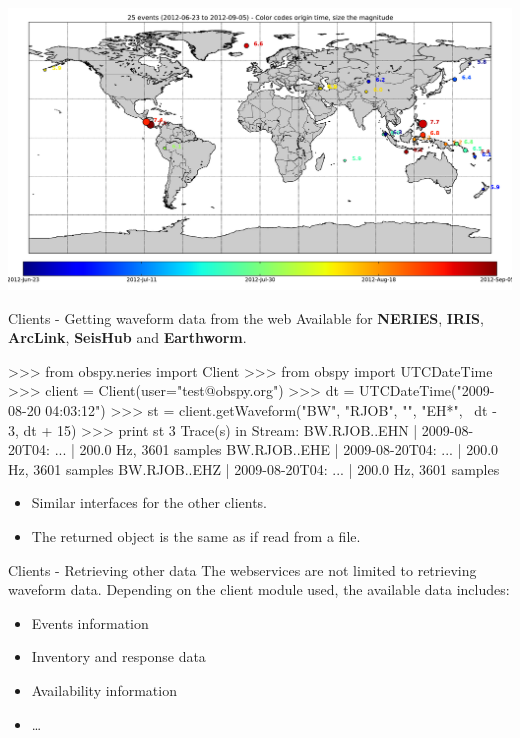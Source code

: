 \documentclass[handout]{beamer}
\begin{document}
\begin{frame}[plain]
\includegraphics[width=\textwidth]{events.pdf}
\end{frame}


\begin{frame}{Clients - Getting waveform data from the web}
    Available for \textbf{NERIES}, \textbf{IRIS}, \textbf{ArcLink}, \textbf{SeisHub} and \textbf{Earthworm}.

\begin{myColorBox}{0.95}{}
\begin{python}
>>> from obspy.neries import Client
>>> from obspy import UTCDateTime
>>> client = Client(user="test@obspy.org")
>>> dt = UTCDateTime("2009-08-20 04:03:12")
>>> st = client.getWaveform("BW", "RJOB", "", "EH*", \
                            dt - 3, dt + 15)
>>> print st
3 Trace(s) in Stream:
BW.RJOB..EHN | 2009-08-20T04: ... | 200.0 Hz, 3601 samples
BW.RJOB..EHE | 2009-08-20T04: ... | 200.0 Hz, 3601 samples
BW.RJOB..EHZ | 2009-08-20T04: ... | 200.0 Hz, 3601 samples
\end{python}
\end{myColorBox}
\begin{itemize}
    \item Similar interfaces for the other clients.
    \item The returned object is the same as if read from a file.
\end{itemize}
\end{frame}


\begin{frame}[plain]{Clients - Retrieving other data}
    The webservices are not limited to retrieving waveform data. Depending on the client module used, the available data includes:
    \vspace{2em}
    \begin{itemize}
        \item Events information
        \item Inventory and response data
        \item Availability information
        \item \dots
    \end{itemize}
\end{frame}
\end{document}
